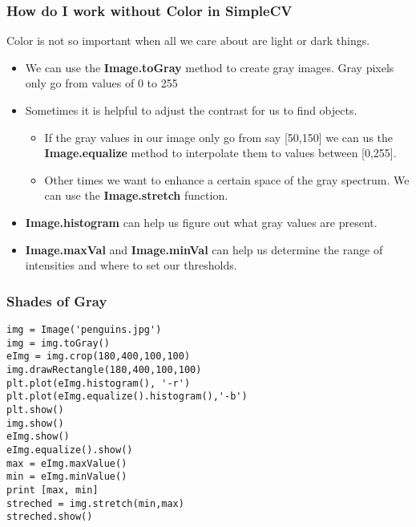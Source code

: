 \documentclass[compress]{beamer}
\begin{document}
\begin{frame}
\frametitle{How do I work \textbf{without}  Color in SimpleCV}
Color is not so important when all we care about are light or dark
things. 
\begin{itemize}
\item We can use the \textbf{Image.toGray} method to create gray
  images. Gray pixels only go from values of 0 to 255
\item Sometimes it is helpful to adjust the contrast for us to find objects.
  \begin{itemize}
    \item If the gray values in our image only go from say [50,150] we
      can us the \textbf{Image.equalize} method to interpolate them to
      values between [0,255].
    \item Other times we want to enhance a certain space of the gray
      spectrum. We can use the \textbf{Image.stretch} function. 
    \end{itemize}
\item \textbf{Image.histogram} can help us figure out what gray values
  are present.
\item \textbf{Image.maxVal} and \textbf{Image.minVal} can help us
  determine the range of intensities and where to set our thresholds.
\end{itemize}
\end{frame}
\begin{frame}[fragile] 
\frametitle{Shades of Gray}
\begin{example}
\begin{verbatim}
img = Image('penguins.jpg')
img = img.toGray()
eImg = img.crop(180,400,100,100)
img.drawRectangle(180,400,100,100)
plt.plot(eImg.histogram(), '-r')
plt.plot(eImg.equalize().histogram(),'-b')
plt.show()
img.show()
eImg.show()
eImg.equalize().show()
max = eImg.maxValue()
min = eImg.minValue()
print [max, min]
streched = img.stretch(min,max)
streched.show()
\end{verbatim}
\end{example}
\end{frame}
\end{document}
